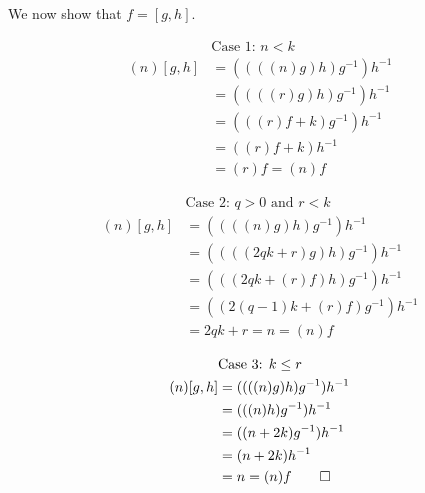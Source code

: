 \documentclass{report}
\begin{document}
We now show that $f=[g,h]$.
\begin{multicols}{3}
\begin{align*}
&\text{Case 1: } n<k\\
(n)[g,h]&=((((n)g)h)g^{-1})h^{-1}\\
&=((((r)g)h)g^{-1})h^{-1}\\
&=(((r)f+k)g^{-1})h^{-1}\\
&=((r)f+k)h^{-1}\\
&=(r)f=(n)f
\end{align*}


\begin{align*}
&\text{Case 2: }q>0\text{ and }r<k\\
(n)[g,h]&=((((n)g)h)g^{-1})h^{-1}\\
&=((((2qk+r)g)h)g^{-1})h^{-1}\\
&=(((2qk+(r)f)h)g^{-1})h^{-1}\\
&=((2(q-1)k+(r)f)g^{-1})h^{-1}\\
&=2qk+r=n=(n)f
\end{align*}


\begin{align*}
&\text{Case 3: }k\leq r\\
(n)[g,h]&=((((n)g)h)g^{-1})h^{-1}\\
&=(((n)h)g^{-1})h^{-1}\\
&=((n+2k)g^{-1})h^{-1}\\
&=(n+2k)h^{-1}\\
&=n=(n)f\qed
\end{align*}
\end{multicols}
\end{document}
